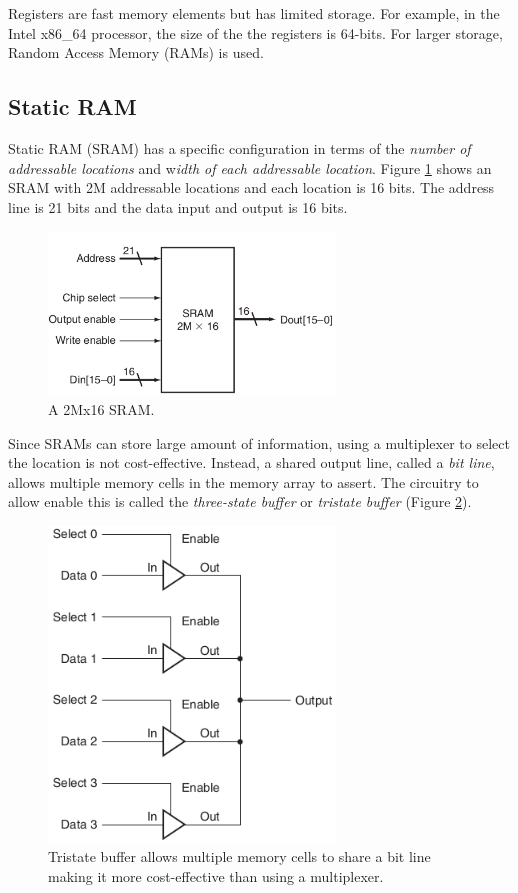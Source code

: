 \documentclass[a4paper, 11pt,oneside]{article}
\begin{document}
Registers are fast memory elements but has limited storage. For example, in the 
Intel x86\_64 processor, the size of the the registers is 64-bits. For larger 
storage, Random Access Memory (RAMs) is used. 


\subsection{Static RAM}
Static RAM (SRAM) has a specific configuration in terms of the \textit{number 
of 
addressable locations} and w\textit{idth of each addressable location}. Figure 
\ref{fig:sram0} shows an SRAM with 2M addressable locations and each
location is 16 bits. The address line is 21 bits and the data input and output 
is 16 bits.

\begin{figure}[H]
	\begin{center}
	\includegraphics[width=3in]{sram0.png}
	\caption{A 2Mx16 SRAM.}
	\label{fig:sram0} 
	\end{center}
\end{figure}

Since SRAMs can store large amount of information, using a multiplexer to 
select the location is not cost-effective. Instead, a shared output line, called
a \textit{bit line}, allows multiple memory cells in the memory array to
assert. The circuitry to allow enable this is called the 
\textit{three-state buffer} or \textit{tristate buffer} 
(Figure \ref{fig:sram1}).

\begin{figure}[H]
	\begin{center}
	\includegraphics[width=3in]{sram1.png}
	\caption{Tristate buffer allows multiple memory cells to share a bit line 
	making it more cost-effective than using a multiplexer.}
	\label{fig:sram1} 
	\end{center}
\end{figure}
\end{document}
